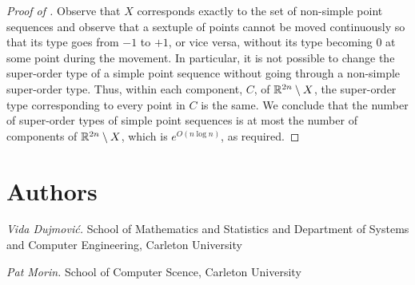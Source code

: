 \documentclass{patmorin}
\begin{document}
\begin{proof}[Proof of ]
   Observe that $X$ corresponds exactly to the set of non-simple
   point sequences and observe that a sextuple of points cannot be moved
   continuously so that its type goes from $-1$ to $+1$, or vice versa,
   without its type becoming $0$ at some point during the movement.
   In particular, it is not possible to change the super-order type of
   a simple point sequence without going through a non-simple super-order type.
   Thus, within each component, $C$, of $\mathbb{R}^{2n}\setminus X$, the
   super-order type corresponding to every point in $C$ is the same.
   We conclude that the number of super-order types of simple point
   sequences is at most the number of components of $\mathbb{R}^{2n}\setminus X$,
   which is $e^{O(n\log n)}$, as required.
\end{proof}

\section*{Authors}


\noindent\emph{Vida Dujmovi\'c.}
School of Mathematics and Statistics and Department of Systems and Computer Engineering, Carleton University

\noindent\emph{Pat Morin.}
School of Computer Scence, Carleton University
\end{document}
